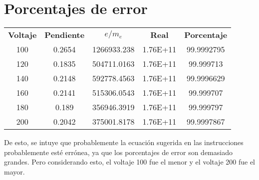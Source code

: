     \section{Porcentajes de error}

\begin{table}[H]
    \centering 
    \begin{tabular}{@{}ccccc@{}}
    \textbf{Voltaje} & \textbf{Pendiente} & \textbf{$e/m_e$} & \textbf{Real} & \textbf{Porcentaje} \\
    100              & 0.2654             & 1266933.238      & 1.76E+11      & 99.9992795          \\
    120              & 0.1835             & 504711.0163      & 1.76E+11      & 99.999713           \\
    140              & 0.2148             & 592778.4563      & 1.76E+11      & 99.9996629          \\
    160              & 0.2141             & 515306.0543      & 1.76E+11      & 99.999707           \\
    180              & 0.189              & 356946.3919      & 1.76E+11      & 99.999797           \\
    200              & 0.2042             & 375001.8178      & 1.76E+11      & 99.9997867         
    \end{tabular}
    \end{table}

    De esto, se intuye que probablemente la ecuación sugerida en las instrucciones probablemente esté errónea, ya que los porcentajes de error son demasiado grandes. Pero considerando esto, el voltaje 100 fue el menor y el voltaje 200 fue el mayor. 


%
%

